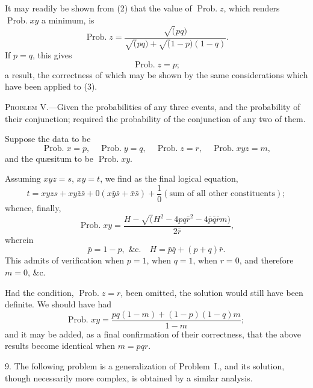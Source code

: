 \documentclass[oneside]{book}
\begin{document}
It may readily be shown from (2) that the value of $\operatorname{Prob. } z$,
which renders $\operatorname{Prob. } xy$ a minimum, is
\begin{equation*}
\operatorname{Prob. } z = \frac{\surd(pq)}{\surd(pq)+\surd(1-p)(1-q)}.
\end{equation*}
If $p = q$, this gives
\begin{equation*}
\operatorname{Prob. } z = p;
\end{equation*}
a result, the correctness of which may be shown by the same
considerations which have been applied to (3).

\textsc{Problem} V.---Given the probabilities of any three events,
and the probability of their conjunction; required the
probability of the conjunction of any two of them.

Suppose the data to be
\begin{equation*}
\operatorname{Prob. } x = p, \quad
\operatorname{Prob. } y = q, \quad
\operatorname{Prob. } z = r, \quad
\operatorname{Prob. } xyz = m,
\end{equation*}
and the qu\ae{}situm to be $\operatorname{Prob. } xy$.

Assuming $xyz = s$, $xy = t$, we find as the final logical
equation,
\begin{equation*}
t=xyzs + xy\bar{z}\bar{s} + 0(x\bar{y}\bar{s} + \bar{x}\bar{s})
+ \frac{1}{0}(\text{sum of all other constituents});
\end{equation*}
whence, finally,
\begin{equation*}
\operatorname{Prob. } xy
= \frac{H-\surd(H^2 - 4pq\bar{r}^2 - 4\bar{p}\bar{q}\bar{r}m)}
       {2\bar{r}},
\end{equation*}
wherein
\begin{equation*}
\bar{p} = 1-p, \text{ \&c}. \quad H= \bar{p}\bar{q} + (p + q)\bar{r}.
\end{equation*}
This admits of verification when $p = 1$, when $q = 1$, when $r = 0$,
and therefore $m = 0$, \&c.

Had the condition, $\operatorname{Prob. } z = r$, been omitted, the solution
would still have been definite. We should have had
\[
  \text{Prob. }xy = \frac{pq(1-m) + (1-p)(1-q)m}{1 - m};
\]
and it may be added, as a final confirmation of their correctness,
that the above results become identical when $m = pqr$.

9. The following problem is a generalization of Problem~I.,
and its solution, though necessarily more complex, is obtained by
a similar analysis.
\end{document}

